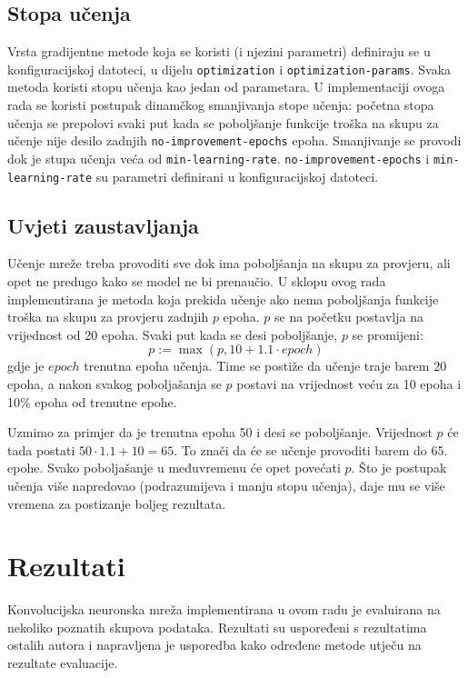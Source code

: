 \documentclass[times, utf8, diplomski, numeric]{fer}
\begin{document}
\section{Stopa učenja}

Vrsta gradijentne metode koja se koristi (i njezini parametri) definiraju se u konfiguracijskoj datoteci, u dijelu \texttt{optimization} i \texttt{optimization-params}. Svaka metoda koristi stopu učenja kao jedan od parametara. U implementaciji ovoga rada se koristi postupak dinamčkog smanjivanja stope učenja: početna stopa učenja se prepolovi svaki put kada se poboljšanje funkcije troška na skupu za učenje  nije desilo zadnjih \texttt{no-improvement-epochs} epoha. Smanjivanje se provodi dok je stupa učenja veća od \texttt{min-learning-rate}. \texttt{no-improvement-epochs} i \texttt{min-learning-rate} su parametri definirani u konfiguracijskoj datoteci.

\section{Uvjeti zaustavljanja}
Učenje mreže treba provoditi sve dok ima poboljšanja na skupu za provjeru, ali opet ne predugo kako se model ne bi prenaučio. U sklopu ovog rada implementirana je metoda koja prekida učenje ako nema poboljšanja funkcije troška na skupu za provjeru  zadnjih $p$ epoha. $p$ se na početku postavlja na vrijednost od 20 epoha. Svaki put kada se desi poboljšanje, $p$ se promijeni:
\begin{equation}
  p := \max \left( p, 10 + 1.1 \cdot epoch \right)
\end{equation}
gdje je $epoch$ trenutna epoha učenja. Time se postiže da učenje traje barem 20 epoha, a nakon svakog poboljašanja se $p$ postavi na vrijednost veću za 10 epoha i 10\% epoha od trenutne epohe.

Uzmimo za primjer da je trenutna epoha 50 i desi se poboljšanje. Vrijednost $p$ će tada postati $50 \cdot 1.1 + 10 = 65$. To znači da će se učenje provoditi barem do 65. epohe. Svako poboljašanje u međuvremenu će opet povećati $p$. Što je postupak učenja više napredovao (podrazumijeva i manju stopu učenja), daje mu se više vremena za postizanje boljeg rezultata.


\chapter{Rezultati}

Konvolucijska neuronska mreža implementirana u ovom radu je evaluirana na nekoliko poznatih skupova podataka. Rezultati su uspoređeni s rezultatima ostalih autora i napravljena je usporedba kako određene metode utječu na rezultate evaluacije.
\end{document}
